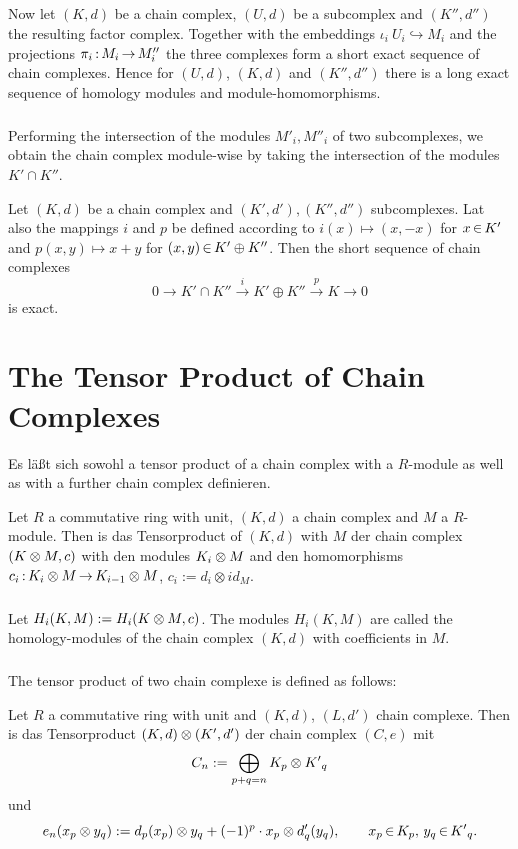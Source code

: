 \documentclass[11pt,twoside]{article}
\begin{document}
\subparagraph{}
Now let $(K,d)$ be a chain complex,
$(U,d)$ be a subcomplex and $(K'',d'')$
the resulting factor complex. 
Together with the embeddings $\iota_i \:U_i \hookrightarrow M_i$
and the projections $\pi_i {\,:\,} M_i {\,\to\,} M''_i$
the three complexes form a short exact sequence of chain complexes.
Hence for $(U,d)$, $(K,d)$ and $(K'',d'')$ there is a long exact
sequence of homology modules and module-homomorphisms.

\subparagraph{}
Performing the intersection of the modules $M'_i, M''_i$ of two subcomplexes,
we obtain the chain complex module-wise
by taking the intersection of the modules $K' \cap K''$.

\begin{theorem1}
Let $(K,d)$ be a chain complex and $(K',d'), (K'',d'')$ subcomplexes.
Lat also the mappings $i$ and $p$ be defined according to
$i(x) \mapsto (x,-x)$ for $x {\,\in\,} K'$ 
and $p(x,y) \mapsto x+y$ for $(x,y) {\,\in\,} K' \oplus K''$.
Then the short sequence of chain complexes
\[
0              \longrightarrow  K' \cap   K'' 
  \stackrel{i}{\longrightarrow} K' \oplus K''
  \stackrel{p}{\longrightarrow} K
               \longrightarrow
0
\]
is exact. 
\end{theorem1}

\section{The Tensor Product of Chain Complexes}
Es läßt sich sowohl a tensor product of a chain complex with a $R$-module
as well as with a further chain complex definieren.

\begin{definition}
Let $R$ a commutative ring with unit,
$(K,d)$ a chain complex and $M$ a $R$-module.
Then is das Tensorproduct of $(K,d)$ with $M$ der chain complex 
$(K \otimes M, c)$ with den modules $K_i \otimes M$ and den
homomorphisms $c_i {\,:\,} K_i \otimes M {\,\to\,} K_{i-1} \otimes M$,
$c_i := d_i \otimes id_M$.
\end{definition}

\subparagraph{}
Let $H_i(K,M) := H_i(K \otimes M,c)$.
The modules $H_i(K,M)$ are called the homology-modules of the chain complex 
$(K,d)$ with coefficients in $M$.

\subparagraph{}
The tensor product of two chain complexe is defined as follows:

\begin{definition}
Let $R$ a commutative ring with unit and $(K,d)$, $(L,d')$ 
chain complexe.
Then is das Tensorproduct $(K,d) \otimes (K',d')$ der
chain complex $(C,e)$ mit
\[
C_n := \bigoplus_{p+q=n} K_p \otimes {K'}_q
\]
und
\[
e_n(x_p \otimes y_q) := d_p(x_p) \otimes y_q + 
             (-1)^p \cdot x_p \otimes d'_q(y_q),
\qquad x_p {\,\in\,} K_p, \, y_q {\,\in\,} {K'}_q.
\]
\end{definition}
\end{document}
